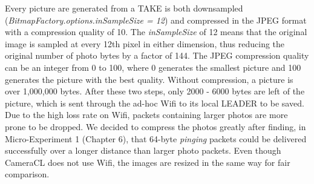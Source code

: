 Every picture are generated from a TAKE is both downsampled ({\it BitmapFactory.options.inSampleSize = 12}) and compressed in the JPEG format with a compression quality of 10. The {\it inSampleSize}  of 12 means that the original image is sampled at every 12th pixel in either dimension, thus reducing the original number of photo bytes by a factor of 144. The JPEG compression quality can be an integer from 0 to 100, where 0 generates the smallest picture and 100 generates the picture with the best quality. Without compression, a picture is over 1,000,000 bytes. After these two steps, only 2000 - 6000 bytes are left of the picture, which is sent through the ad-hoc Wifi to its local LEADER to be saved. Due to the high loss rate on Wifi, packets containing larger photos are more prone to be dropped. We decided to compress the photos greatly after finding, in Micro-Experiment 1 (Chapter 6), that 64-byte {\it pinging} packets could be delivered successfully over a longer distance than larger photo packets. Even though CameraCL does not use Wifi, the images are resized in the same way for fair comparison.